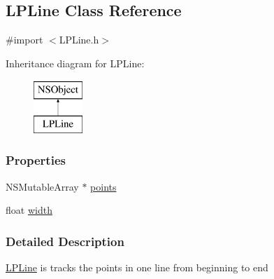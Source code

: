 \hypertarget{interface_l_p_line}{\subsection{L\-P\-Line Class Reference}
\label{df/dbc/interface_l_p_line}
}


{\ttfamily \#import $<$L\-P\-Line.\-h$>$}

Inheritance diagram for L\-P\-Line\-:\begin{figure}[H]
\begin{center}
\leavevmode
\includegraphics[height=2.000000cm]{df/dbc/interface_l_p_line}
\end{center}
\end{figure}
\subsubsection*{Properties}
\begin{DoxyCompactItemize}
\item 
N\-S\-Mutable\-Array $\ast$ \hyperlink{interface_l_p_line_a3f5edffc9c461de1a0cbda01de250bd2}{points}
\item 
float \hyperlink{interface_l_p_line_a4d06bc7cac330ed07213cb50229313fd}{width}
\end{DoxyCompactItemize}


\subsubsection{Detailed Description}
\hyperlink{interface_l_p_line}{L\-P\-Line} is tracks the points in one line from beginning to end 

